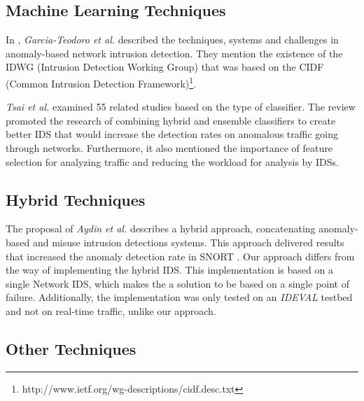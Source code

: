 \documentclass[conference]{IEEEtran}
\begin{document}

\subsection{Machine Learning Techniques}
In \cite{garcia2009anomaly},  \textit{Garcia-Teodoro et al.} described the techniques, systems and challenges in anomaly-based network intrusion detection.  They mention the existence of the IDWG (Intrusion Detection Working Group) that was based on the CIDF (Common Intrusion Detection Framework)\footnote{http://www.ietf.org/wg-descriptions/cidf.desc.txt}.  

\textit{Tsai et al.} \cite{tsai2009intrusion} %
examined 55 related studies based on the type of classifier. 
The review promoted the research of combining hybrid and ensemble classifiers to create better IDS that would increase the detection rates on anomalous traffic going through networks.  Furthermore, it also mentioned the importance of feature selection for analyzing traffic and reducing the workload for analysis by IDSs.

\subsection{Hybrid Techniques} 

The proposal of \textit{Aydin et al.} \cite{aydin2009hybrid} describes a hybrid approach, concatenating anomaly-based and misuse intrusion detections systems.  This approach delivered results that increased the anomaly detection rate in SNORT \cite{SNORT}. %
Our approach differs from the way of implementing the hybrid IDS.  This implementation is based on a single Network IDS, which makes the a solution to be based on a single point of failure. Additionally, the implementation was only tested on an \textit{IDEVAL} \cite{IDEVAL} testbed and not on real-time traffic, unlike our approach.

\subsection{Other Techniques}
\end{document}
